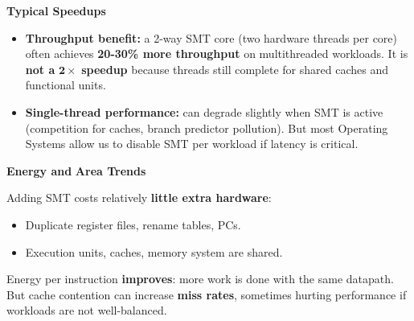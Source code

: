 \highspace
\begin{flushleft}
    \textcolor{Green3}{\faIcon{\speedIcon} \textbf{Typical Speedups}}
\end{flushleft}
\begin{itemize}
    \item[\textcolor{Green3}{\faIcon{check}}] \textcolor{Green3}{\textbf{Throughput benefit:}} a 2-way SMT core (two hardware threads per core) often achieves \textbf{20-30\% more throughput} on multithreaded workloads. It is \textbf{not a} $\mathbf{2\times}$ \textbf{speedup} because threads still complete for shared caches and functional units.


    \item[\textcolor{Red2}{\faIcon{\speedIcon}}] \textcolor{Red2}{\textbf{Single-thread performance:}} can degrade slightly when SMT is active (competition for caches, branch predictor pollution). But most Operating Systems allow us to disable SMT per workload if latency is critical.
\end{itemize}

\highspace
\begin{flushleft}
    \textcolor{Green3}{ \textbf{Energy and}  \textbf{Area Trends}}
\end{flushleft}
Adding SMT costs relatively \textbf{little extra hardware}:
\begin{itemize}
    \item[\textcolor{Red2}{\faIcon{plus-circle}}] Duplicate register files, rename tables, PCs.
    \item[\textcolor{Green3}{\faIcon{share-alt}}] Execution units, caches, memory system are shared.
\end{itemize}
Energy per instruction \textbf{improves}: more work is done with the same datapath. But cache contention can increase \textbf{miss rates}, sometimes hurting performance if workloads are not well-balanced.